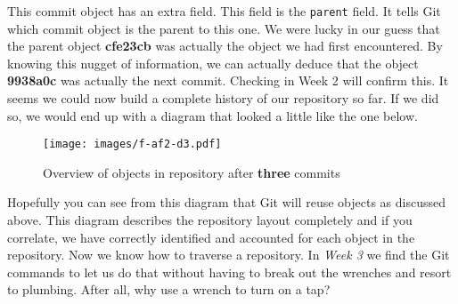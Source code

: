 This commit object has an extra field.
This field is the \texttt{parent} field.
It tells Git which commit object is the parent to this one.
We were lucky in our guess that the parent object \textbf{cfe23cb} was actually the object we had first encountered.
By knowing this nugget of information, we can actually deduce that the object \textbf{9938a0c} was actually the next commit.
Checking in Week 2 will confirm this.
It seems we could now build a complete history of our repository so far.
If we did so, we would end up with a diagram that looked a little like the one below.

\begin{figure}[hbt]
\centering
\texttt{[image: images/f-af2-d3.pdf]}
\caption{Overview of objects in repository after \textbf{three} commits}
\end{figure}

Hopefully you can see from this diagram that Git will reuse objects as discussed above.
This diagram describes the repository layout completely and if you correlate, we have correctly identified and accounted for each object in the repository.
Now we know how to traverse a repository.
In \emph{Week 3} we find the Git commands to let us do that without having to break out the wrenches and resort to plumbing.
After all, why use a wrench to turn on a tap?
